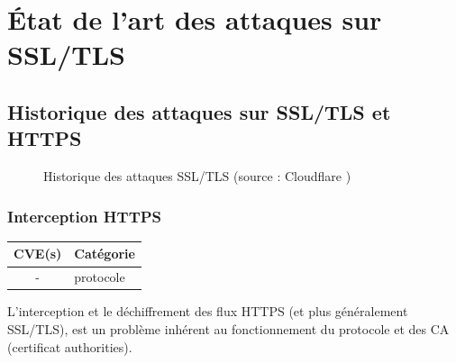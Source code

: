 \chapter{État de l'art des attaques sur SSL/TLS}

\section{Historique des attaques sur SSL/TLS et HTTPS}

\begin{figure}[H]
  \caption{Historique des attaques SSL/TLS (source : Cloudflare \cite{cloudflare})}
\end{figure}



\subsection{Interception HTTPS}

\begin{tabularx}{0.96\textwidth}{|c|X|}
  \hline
  \textbf{CVE(s)} & \textbf{Catégorie} \\
  \hline
  - & protocole \\
  \hline
\end{tabularx}

\vspace{1em}

L'interception et le déchiffrement des flux HTTPS (et plus généralement SSL/TLS), est un problème inhérent au fonctionnement du protocole et des CA (certificat authorities).

